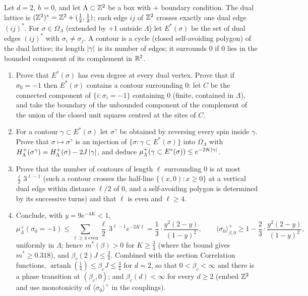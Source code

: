 \begin{exercise}
Let $d=2$, $h=0$, and let $\Lambda\subset\mathbb Z^2$ be a box with $+$ boundary
condition.  The dual lattice is $(\mathbb Z^2)^*=\mathbb Z^2+(\tfrac12,\tfrac12)$; each edge
$ij$ of $\mathbb Z^2$ crosses exactly one dual edge $(ij)^*$.  For
$\sigma\in\Omega_\Lambda$ (extended by $+1$ outside $\Lambda$) let
$E^*(\sigma)$ be the set of dual edges $(ij)^*$ with $\sigma_i\ne\sigma_j$.  A
contour is a cycle (closed self-avoiding polygon) of the dual lattice; its
length $\left\lvert \gamma\right\rvert$ is its number of edges; it surrounds $0$ if $0$ lies in
the bounded component of its complement in $\mathbb R^2$.
\begin{enumerate}[label=(\alph*)]
\item Prove that $E^*(\sigma)$ has even degree at every dual vertex.  Prove
that if $\sigma_0=-1$ then $E^*(\sigma)$ contains a contour surrounding $0$:
let $C$ be the connected component of $\{i:\sigma_i=-1\}$ containing $0$
(finite, contained in $\Lambda$), and take the boundary of the unbounded
component of the complement of the union of the closed unit squares centred
at the sites of $C$.
\item For a contour $\gamma\subset E^*(\sigma)$ let $\sigma^\gamma$ be
obtained by reversing every spin inside $\gamma$.  Prove that
$\sigma\mapsto\sigma^\gamma$ is an injection of $\{\sigma:\gamma\subset E^*(\sigma)\}$
into $\Omega_\Lambda$ with $H^+_\Lambda(\sigma^\gamma)=H^+_\Lambda(\sigma)-2J\left\lvert \gamma\right\rvert$,
and deduce $\mu^+_\Lambda(\gamma\subset E^*(\sigma))\le e^{-2K\left\lvert \gamma\right\rvert}$.
\item Prove that the number of contours of length $\ell$ surrounding $0$ is
at most $\tfrac\ell2\,3^{\ell-1}$ (such a contour crosses the half-line
$\{(x,0):x\ge0\}$ at a vertical dual edge within distance $\ell/2$ of $0$, and
a self-avoiding polygon is determined by its successive turns) and that
$\ell$ is even and $\ell\ge4$.
\item Conclude, with $y=9e^{-4K}<1$,
\[
 \mu^+_\Lambda(\sigma_0=-1)\le\sum_{\ell\ge4\text{ even}}\frac\ell2\,3^{\ell-1}e^{-2K\ell}
 =\frac13\cdot\frac{y^2(2-y)}{(1-y)^2},
 \qquad
 \langle\sigma_0\rangle^+_{\beta,0}\ge1-\frac23\cdot\frac{y^2(2-y)}{(1-y)^2},
\]
uniformly in $\Lambda$; hence $m^*(\beta)>0$ for $K\ge\tfrac34$ (where the
bound gives $m^*\ge0.318$), and $\beta_c(2)J\le\tfrac34$.  Combined with the
section Correlation functions, $\operatorname{artanh}(\tfrac14)\le\beta_cJ\le\tfrac34$
for $d=2$, so that $0<\beta_c<\infty$ and there is a phase transition at
$(\beta_c,0)$; and $\beta_c(d)<\infty$ for every $d\ge2$ (embed $\mathbb Z^2$ and use
monotonicity of $\langle\sigma_0\rangle^+$ in the couplings).
\end{enumerate}
\end{exercise}

